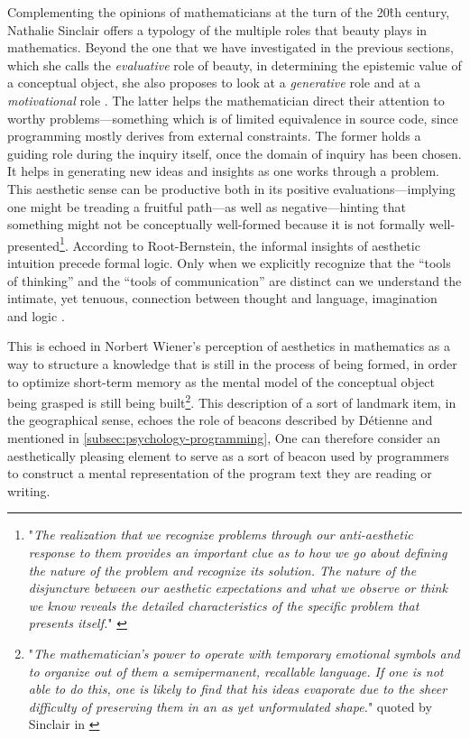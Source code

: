 Complementing the opinions of mathematicians at the turn of the 20\^{th} century, Nathalie Sinclair offers a typology of the multiple roles that beauty plays in mathematics. Beyond the one that we have investigated in the previous sections, which she calls the \emph{evaluative} role of beauty, in determining the epistemic value of a conceptual object, she also proposes to look at a \emph{generative} role and at a \emph{motivational} role \citep{sinclair_aesthetic_2011}. The latter helps the mathematician direct their attention to worthy problems—something which is of limited equivalence in source code, since programming mostly derives from external constraints. The former holds a guiding role during the inquiry itself, once the domain of inquiry has been chosen. It helps in generating new ideas and insights as one works through a problem. This aesthetic sense can be productive both in its positive evaluations—implying one might be treading a fruitful path—as well as negative—hinting that something might not be conceptually well-formed because it is not formally well-presented\footnote{"\emph{The realization that we recognize problems through our anti-aesthetic response to them provides an important clue as to how we go about defining the nature of the problem and recognize its solution. The nature of the disjuncture between our aesthetic expectations and what we observe or think we know reveals the detailed characteristics of the specific problem that presents itself.}" \citep{root-bernstein_aesthetic_2002}}. According to Root-Bernstein, the informal insights of aesthetic intuition precede formal logic. Only when we explicitly recognize that the “tools of thinking” and the “tools of communication” are distinct can we understand the intimate, yet tenuous, connection between thought and language, imagination and logic \citep{root-bernstein_aesthetic_2002}.

This is echoed in Norbert Wiener's perception of aesthetics in mathematics as a way to structure a knowledge that is still in the process of being formed, in order to optimize short-term memory as the mental model of the conceptual object being grasped is still being built\footnote{"\emph{The mathematician's power to operate with temporary emotional symbols and to organize out of them a semipermanent, recallable language. If one is not able to do this, one is likely to find that his ideas evaporate due to the sheer difficulty of preserving them in an as yet unformulated shape.}" quoted by Sinclair in \citep{sinclair_roles_2004}}. This description of a sort of landmark item, in the geographical sense, echoes the role of beacons described by Détienne \citep{detienne_software_2001} and mentioned in \ref{subsec:psychology-programming}, One can therefore consider an aesthetically pleasing element to serve as a sort of beacon used by programmers to construct a mental representation of the program text they are reading or writing.

